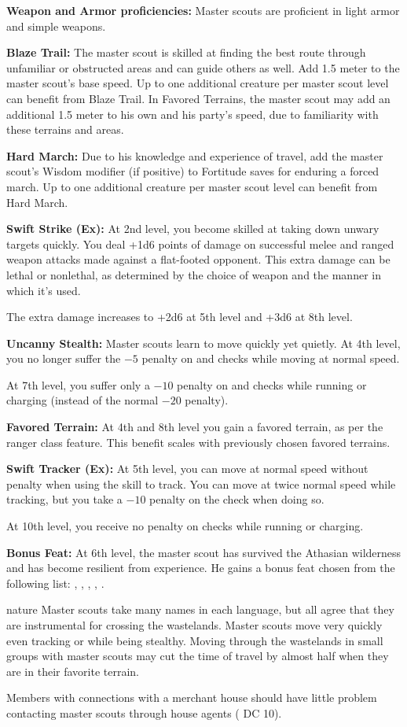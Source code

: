 {
\textbf{Weapon and Armor proficiencies:} Master scouts are proficient in light armor and simple weapons.

\textbf{Blaze Trail:} The master scout is skilled at finding the best route through unfamiliar or obstructed areas and can guide others as well. Add 1.5 meter to the master scout's base speed. Up to one additional creature per master scout level can benefit from Blaze Trail. In Favored Terrains, the master scout may add an additional 1.5 meter to his own and his party's speed, due to familiarity with these terrains and areas.

\textbf{Hard March:} Due to his knowledge and experience of travel, add the master scout's Wisdom modifier (if positive) to Fortitude saves for enduring a forced march. Up to one additional creature per master scout level can benefit from Hard March.

\textbf{Swift Strike (Ex):} At 2nd level, you become skilled at taking down unwary targets quickly. You deal +1d6 points of damage on successful melee and ranged weapon attacks made against a flat-footed opponent. This extra damage can be lethal or nonlethal, as determined by the choice of weapon and the manner in which it's used.

The extra damage increases to +2d6 at 5th level and +3d6 at 8th level.

\textbf{Uncanny Stealth:} Master scouts learn to move quickly yet quietly. At 4th level, you no longer suffer the $-5$ penalty on  and  checks while moving at normal speed.

At 7th level, you suffer only a $-10$ penalty on  and  checks while running or charging (instead of the normal $-20$ penalty).

\textbf{Favored Terrain:} At 4th and 8th level you gain a favored terrain, as per the ranger class feature. This benefit scales with previously chosen favored terrains.

\textbf{Swift Tracker (Ex):} At 5th level, you can move at normal speed without penalty when using the  skill to track. You can move at twice normal speed while tracking, but you take a $-10$ penalty on the check when doing so.

At 10th level, you receive no penalty on  checks while running or charging.

\textbf{Bonus Feat:} At 6th level, the master scout has survived the Athasian wilderness and has become resilient from experience. He gains a bonus feat chosen from the following list: , , , , .
}
{}
{nature}
{Master scouts take many names in each language, but all agree that they are instrumental for crossing the wastelands.}
{Master scouts move very quickly even tracking or while being stealthy.}
{Moving through the wastelands in small groups with master scouts may cut the time of travel by almost half when they are in their favorite terrain.}

Members with connections with a merchant house should have little problem contacting master scouts through house agents ( DC 10).